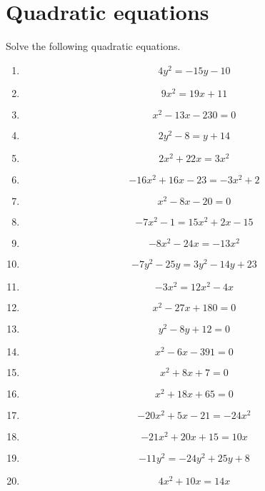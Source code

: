 \documentclass{article}
\begin{document}
        \section{Quadratic equations}
        Solve the following quadratic equations.
        \begin{multicols}{1}
        \begin{enumerate}
        \item $$4 y^{2} = - 15 y - 10$$
\item $$9 x^{2} = 19 x + 11$$
\item $$x^{2} - 13 x - 230 = 0$$
\item $$2 y^{2} - 8 = y + 14$$
\item $$2 x^{2} + 22 x = 3 x^{2}$$
\item $$- 16 x^{2} + 16 x - 23 = - 3 x^{2} + 2$$
\item $$x^{2} - 8 x - 20 = 0$$
\item $$- 7 x^{2} - 1 = 15 x^{2} + 2 x - 15$$
\item $$- 8 x^{2} - 24 x = - 13 x^{2}$$
\item $$- 7 y^{2} - 25 y = 3 y^{2} - 14 y + 23$$
\item $$- 3 x^{2} = 12 x^{2} - 4 x$$
\item $$x^{2} - 27 x + 180 = 0$$
\item $$y^{2} - 8 y + 12 = 0$$
\item $$x^{2} - 6 x - 391 = 0$$
\item $$x^{2} + 8 x + 7 = 0$$
\item $$x^{2} + 18 x + 65 = 0$$
\item $$- 20 x^{2} + 5 x - 21 = - 24 x^{2}$$
\item $$- 21 x^{2} + 20 x + 15 = 10 x$$
\item $$- 11 y^{2} = - 24 y^{2} + 25 y + 8$$
\item $$4 x^{2} + 10 x = 14 x$$
        \end{enumerate}
        \end{multicols}
        
\end{document}
